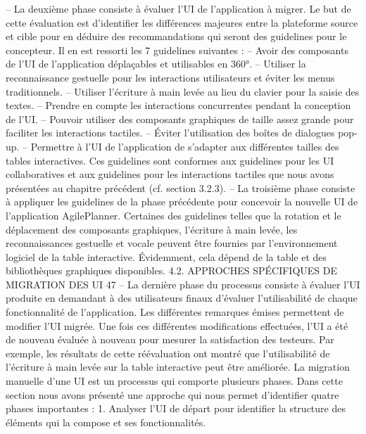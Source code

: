 \documentclass{article}
\begin{document}
– La deuxi\`{e}me phase consiste \`{a} \'{e}valuer l’UI de l’application \`{a} migrer. Le but de cette \'{e}valuation
est d’identiﬁer les diff\'{e}rences majeures entre la plateforme source et cible pour en d\'{e}duire des
recommandations qui seront des guidelines pour le concepteur. Il en est ressorti les 7 guidelines
suivantes :
– Avoir des composants de l’UI de l’application d\'{e}pla\c{c}ables et utilisables en 360°.
– Utiliser la reconnaissance gestuelle pour les interactions utilisateurs et \'{e}viter les menus traditionnels.
– Utiliser l’\'{e}criture \`{a} main lev\'{e}e au lieu du clavier pour la saisie des textes.
– Prendre en compte les interactions concurrentes pendant la conception de l’UI.
– Pouvoir utiliser des composants graphiques de taille assez grande pour faciliter les interactions tactiles.
– Éviter l’utilisation des bo\^{i}tes de dialogues pop-up.
– Permettre \`{a} l’UI de l’application de s’adapter aux diff\'{e}rentes tailles des tables interactives.
Ces guidelines sont conformes aux guidelines pour les UI collaboratives et aux guidelines pour
les interactions tactiles que nous avons pr\'{e}sent\'{e}es au chapitre pr\'{e}c\'{e}dent (cf. section 3.2.3).
– La troisi\`{e}me phase consiste \`{a} appliquer les guidelines de la phase pr\'{e}c\'{e}dente pour concevoir la
nouvelle UI de l’application AgilePlanner. Certaines des guidelines telles que la rotation et le
d\'{e}placement des composants graphiques, l’\'{e}criture \`{a} main lev\'{e}e, les reconnaissances gestuelle
et vocale peuvent \^{e}tre fournies par l’environnement logiciel de la table interactive. Évidemment,
cela d\'{e}pend de la table et des biblioth\`{e}ques graphiques disponibles.
4.2. APPROCHES SPÉCIFIQUES DE MIGRATION DES UI
47
– La derni\`{e}re phase du processus consiste \`{a} \'{e}valuer l’UI produite en demandant \`{a} des utilisateurs ﬁnaux d’\'{e}valuer l’utilisabilit\'{e} de chaque fonctionnalit\'{e} de l’application. Les diff\'{e}rentes
remarques \'{e}mises permettent de modiﬁer l’UI migr\'{e}e. Une fois ces diff\'{e}rentes modiﬁcations
effectu\'{e}es, l’UI a \'{e}t\'{e} de nouveau \'{e}valu\'{e}e \`{a} nouveau pour mesurer la satisfaction des testeurs.
Par exemple, les r\'{e}sultats de cette r\'{e}\'{e}valuation ont montr\'{e} que l’utilisabilit\'{e} de l’\'{e}criture \`{a} main
lev\'{e}e sur la table interactive peut \^{e}tre am\'{e}lior\'{e}e.
La migration manuelle d’une UI est un processus qui comporte plusieurs phases. Dans cette section nous avons pr\'{e}sent\'{e} une approche qui nous permet d’identiﬁer quatre phases importantes :
1. Analyser l’UI de d\'{e}part pour identiﬁer la structure des \'{e}l\'{e}ments qui la compose et ses fonctionnalit\'{e}s.
\end{document}
